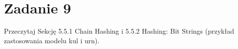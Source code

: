 \section{Zadanie 9}
Przeczytaj Sekcję 5.5.1 Chain Hashing i 5.5.2 Hashing: Bit Strings (przykład
zastosowania modelu kul i urn).
